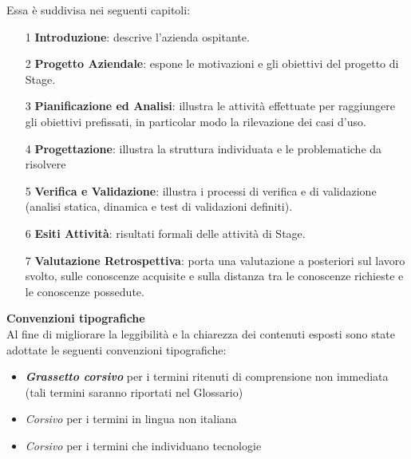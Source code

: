 \documentclass[10pt, a4paper, oneside]{Thesis} %
\begin{document}
Essa è suddivisa nei seguenti capitoli:

\begin{itemize}
\item[1] \textbf{Introduzione}: descrive l'azienda ospitante.
\item[2] \textbf{Progetto Aziendale}: espone le motivazioni e gli obiettivi del progetto di Stage.
\item[3] \textbf{Pianificazione ed Analisi}: illustra le attività effettuate per raggiungere gli obiettivi prefissati, in particolar modo la rilevazione dei casi d'uso.
\item[4] \textbf{Progettazione}: illustra la struttura individuata e le problematiche da risolvere
\item[5] \textbf{Verifica e Validazione}: illustra i processi di verifica e di validazione (analisi statica, dinamica e test di validazioni definiti).
\item[6] \textbf{Esiti Attività}: risultati formali delle attività di Stage.
\item[7] \textbf{Valutazione Retrospettiva}: porta una valutazione a posteriori sul lavoro svolto, sulle conoscenze acquisite e sulla distanza tra le conoscenze richieste e le conoscenze possedute.

\end{itemize}


\clearpage
\textbf{Convenzioni tipografiche}\\


Al fine di migliorare la leggibilità e la chiarezza dei contenuti esposti sono state adottate le seguenti
convenzioni tipografiche:

\begin{itemize}
  \item \textbf{\textit{Grassetto corsivo}} per i termini ritenuti di comprensione non immediata (tali termini saranno riportati nel Glossario)
  \item \textit{Corsivo} per i termini in lingua non italiana
  \item \textit{Corsivo} per i termini che individuano tecnologie
\end{itemize}

\clearpage %


\pagestyle{fancy} %
\end{document}
